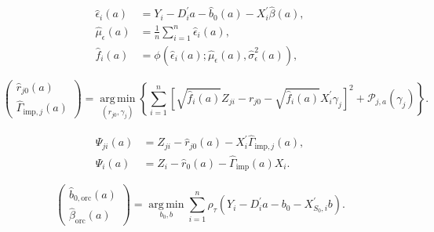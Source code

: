 \begin{equation}
    \begin{aligned}
        \widehat{\epsilon}_i(a)
        &=
        Y_i-D_i^{\prime}a-\widehat b_0(a)
        -X_i^{\prime}\widehat{\beta}(a),\\
        \widehat{\mu}_{\epsilon}(a)
        &=\frac{1}{n}\sum_{i=1}^{n}\widehat{\epsilon}_i(a),\\
        \widehat f_i(a)
        &=
        \phi\!\left(
            \widehat{\epsilon}_i(a);
            \widehat{\mu}_{\epsilon}(a),
            \widehat{\sigma}_{\epsilon}^{2}(a)
        \right),
    \end{aligned}
    \label{eq:estimated-profile-residual}
\end{equation}

\begin{equation}
    \begin{pmatrix}
        \widehat r_{j0}(a)\\
        \widehat\Gamma_{\mathrm{imp},j}(a)
    \end{pmatrix}
    =
    \operatorname*{arg\,min}_{(r_{j0},\gamma_j)}
    \left\{
        \sum_{i=1}^{n}
        \left[
            \sqrt{\widehat f_i(a)}Z_{ji}
            -r_{j0}
            -\sqrt{\widehat f_i(a)}X_i^{\prime}\gamma_j
        \right]^2
        +\mathcal{P}_{j,a}(\gamma_j)
    \right\}.
    \label{eq:dml-residualization-implementation}
\end{equation}

\begin{equation}
    \begin{aligned}
        \widehat\Psi_{ji}(a)
        &=
        Z_{ji}-\widehat r_{j0}(a)-X_i^{\prime}\widehat\Gamma_{\mathrm{imp},j}(a),\\
        \widehat\Psi_i(a)
        &=
        Z_i-\widehat r_0(a)-\widehat\Gamma_{\mathrm{imp}}(a)X_i.
    \end{aligned}
    \label{eq:estimated-residualized-instrument}
\end{equation}

\begin{equation}
    \begin{pmatrix}
        \widehat b_{0,\mathrm{orc}}(a)\\
        \widehat\beta_{\mathrm{orc}}(a)
    \end{pmatrix}
    =
    \operatorname*{arg\,min}_{b_0,b}
    \sum_{i=1}^{n}
    \rho_{\tau}\!\left(
        Y_i-D_i^{\prime}a-b_0-X_{S_0,i}^{\prime}b
    \right).
    \label{eq:oracle-beta}
\end{equation}

